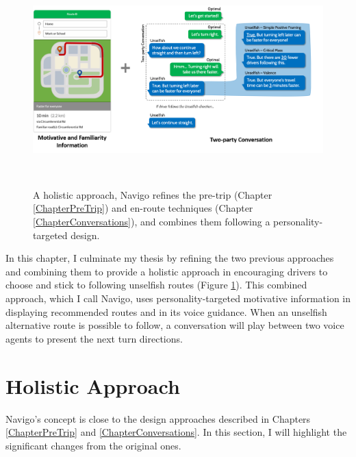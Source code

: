 \begin{figure}[h]
\centering
  \includegraphics[scale=.5]{figures/s4-navigo.png}
  \caption{A holistic approach, Navigo refines the pre-trip (Chapter \ref{ChapterPreTrip}) and en-route techniques (Chapter \ref{ChapterConversations}), and combines them following a personality-targeted design.}~\label{fig:s4-navigo}
\end{figure}

In this chapter, I culminate my thesis by refining the two previous approaches and combining them to provide a holistic approach in encouraging drivers to choose and stick to following unselfish routes (Figure \ref{fig:s4-navigo}). This combined approach, which I call Navigo, uses personality-targeted motivative information in displaying recommended routes and in its voice guidance. When an unselfish alternative route is possible to follow, a conversation will play between two voice agents to present the next turn directions. 

\section{Holistic Approach}

Navigo's concept is close to the design approaches described in Chapters \ref{ChapterPreTrip} and \ref{ChapterConversations}. In this section, I will highlight the significant changes from the original ones. 

